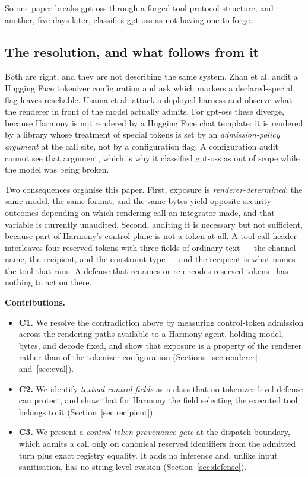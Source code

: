 \documentclass[conference]{IEEEtran}
\begin{document}
So one paper breaks gpt-oss through a forged tool-protocol structure, and
another, five days later, classifies gpt-oss as not having one to forge.

\subsection{The resolution, and what follows from it}

Both are right, and they are not describing the same system. Zhan et al. audit a
Hugging Face tokenizer configuration and ask which markers a declared-special
flag leaves reachable. Usama et al. attack a deployed harness and observe what
the renderer in front of the model actually admits. For gpt-oss these diverge,
because Harmony is not rendered by a Hugging Face chat template: it is rendered
by a library whose treatment of special tokens is set by an
\emph{admission-policy argument} at the call site, not by a configuration flag.
A configuration audit cannot see that argument, which is why it classified
gpt-oss as out of scope while the model was being broken.

Two consequences organise this paper. First, exposure is
\emph{renderer-determined}: the same model, the same format, and the same bytes
yield opposite security outcomes depending on which rendering call an integrator
made, and that variable is currently unaudited. Second, auditing it is necessary
but not sufficient, because part of Harmony's control plane is not a token at
all. A tool-call header interleaves four reserved tokens with three fields of
ordinary text --- the channel name, the recipient, and the constraint type ---
and the recipient is what names the tool that runs. A defense that renames or
re-encodes reserved tokens~\cite{yang2026nameless} has nothing to act on there.

\textbf{Contributions.}

\begin{itemize}
\item \textbf{C1.} We resolve the contradiction above by measuring control-token
admission across the rendering paths available to a Harmony agent, holding
model, bytes, and decode fixed, and show that exposure is a property of the
renderer rather than of the tokenizer configuration
(Sections~\ref{sec:renderer} and~\ref{sec:eval}).
\item \textbf{C2.} We identify \emph{textual control fields} as a class that no
tokenizer-level defense can protect, and show that for Harmony the field
selecting the executed tool belongs to it (Section~\ref{sec:recipient}).
\item \textbf{C3.} We present a \emph{control-token provenance gate} at the
dispatch boundary, which admits a call only on canonical reserved identifiers
from the admitted turn plus exact registry equality. It adds no inference and,
unlike input sanitisation, has no string-level evasion
(Section~\ref{sec:defense}).
\end{itemize}
\end{document}
